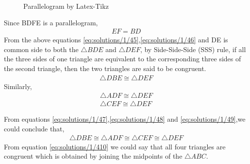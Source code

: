 \begin{figure}[!ht]
\centering
\resizebox{\columnwidth}{!}{}
\caption{Parallelogram by Latex-Tikz}
\label{fig:solutions/1/4Parallelogram}
\end{figure}
Since BDFE is a parallelogram,
\begin{align}
    EF=BD \label{eq:solutions/1/46}
\end{align}
From the above equations \ref{eq:solutions/1/45},\ref{eq:solutions/1/46} and DE is common side to both the $\triangle{BDE}$ and $\triangle{DEF}$, by Side-Side-Side (SSS) rule, if all the three sides of one triangle are equivalent to the corresponding three sides of the second triangle, then the two triangles are said to be congruent.
\begin{align}
    \triangle{DBE}\cong{\triangle{DEF}} \label{eq:solutions/1/47}
\end{align}
Similarly,
\begin{align}
    \triangle{ADF}\cong{\triangle{DEF}} \label{eq:solutions/1/48}\\
    \triangle{CEF}\cong{\triangle{DEF}} \label{eq:solutions/1/49}
\end{align}

From equations \ref{eq:solutions/1/47},\ref{eq:solutions/1/48} and \ref{eq:solutions/1/49},we could conclude that,
\begin{align}
    \triangle{DBE}\cong{\triangle{ADF}}\cong{\triangle{CEF}}\cong{\triangle{DEF}} \label{eq:solutions/1/410}
\end{align}
From equation \ref{eq:solutions/1/410} we could say that all four triangles are congruent which is obtained by joining the midpoints of the $\triangle{ABC}$.

